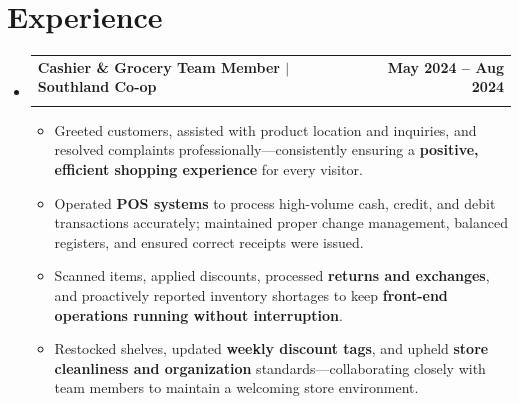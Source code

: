 \documentclass[letterpaper,10.5pt]{article}
\makeatletter
\newcommand{\resumeItem}[1]{
  \item\small{
    {#1 \vspace{0pt}}
  }
}
\newcommand{\resumeSubheading}[4]{
  \vspace{-1pt}\item
    \begin{tabular*}{1.0\textwidth}[t]{l@{\extracolsep{\fill}}r}
      \textbf{#1} & \textbf{\small #2} \\
      \textit{\small#3} & \textit{\small #4} \\[-2pt]
    \end{tabular*}\vspace{-5pt}
}
\newcommand{\resumeSubHeadingListStart}{\begin{itemize}[leftmargin=0.0in, label={}]}
\newcommand{\resumeSubHeadingListEnd}{\end{itemize}}
\newcommand{\resumeItemListStart}{\begin{itemize}[leftmargin=0.15in, topsep=1pt, itemsep=1pt, parsep=0pt, partopsep=0pt]}
\newcommand{\resumeItemListEnd}{\end{itemize}\vspace{-2pt}}
\makeatother
\begin{document}
\section{Experience}
  \resumeSubHeadingListStart
    \resumeSubheading
      {Cashier \& Grocery Team Member $|$ Southland Co-op}{May 2024 -- Aug 2024}
      {}{}
      \vspace{-8pt}
      \resumeItemListStart
        \resumeItem{Greeted customers, assisted with product location and inquiries, and resolved complaints professionally---consistently ensuring a \textbf{positive, efficient shopping experience} for every visitor.}
        \resumeItem{Operated \textbf{POS systems} to process high-volume cash, credit, and debit transactions accurately; maintained proper change management, balanced registers, and ensured correct receipts were issued.}
        \resumeItem{Scanned items, applied discounts, processed \textbf{returns and exchanges}, and proactively reported inventory shortages to keep \textbf{front-end operations running without interruption}.}
        \resumeItem{Restocked shelves, updated \textbf{weekly discount tags}, and upheld \textbf{store cleanliness and organization} standards---collaborating closely with team members to maintain a welcoming store environment.}
      \resumeItemListEnd
  \resumeSubHeadingListEnd
\vspace{-4pt}

\end{document}
